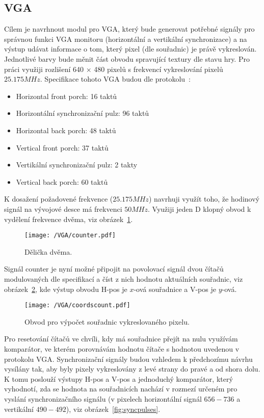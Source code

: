 \documentclass{report}
\begin{document}
\subsection{VGA}\label{sec:vgasub}
Cílem je navrhnout modul pro VGA, který bude generovat potřebné signály pro správnou funkci VGA monitoru (horizontální a vertikální synchronizace) a na výstup udávat informace o tom, který pixel (dle souřadnic) je právě vykreslován. Jednotlivé barvy bude měnit část obvodu spravující textury dle stavu hry. Pro práci využiji rozlišení 640 × 480 pixelů s frekvencí vykreslování pixelů $25.175MHz$. Specifikace tohoto VGA budou dle protokolu~\cite{vga}: 
\begin{itemize}
  \item Horizontal front porch: 16 taktů
  \item Horizontální synchronizační pulz: 96 taktů
  \item Horizontal back porch: 48 taktů
  \item Vertical front porch: 37 taktů
  \item Vertikální synchronizační pulz: 2 takty
  \item Vertical back porch: 60 taktů
\end{itemize}
K dosažení požadovené frekvence ($25.175MHz$) navrhuji využít toho, že hodinový signál na vývojové desce má frekvenci $50MHz$. Využiji jeden D klopný obvod k vydělení frekvence dvěma, viz obrázek~\ref{fig:vgacounter}.
\begin{figure}
\centering
\texttt{[image: /VGA/counter.pdf]}
\caption{Dělička dvěma.}
\label{fig:vgacounter}
\end{figure}
Signál counter je nyní možné připojit na povolovací signál dvou čítačů modulovaných dle specifikací a číst z nich hodnotu aktuálních souřadnic, viz obrázek~\ref{fig:vgapos}, kde výstup obvodu H-pos je $x$-ová souřadnice a V-pos je $y$-ová.
\begin{figure}
\centering
\texttt{[image: /VGA/coordscount.pdf]}
\caption{Obvod pro výpočet souřadnic vykreslovaného pixelu.}
\label{fig:vgapos}
\end{figure}
Pro resetování čítačů ve chvíli, kdy má souřadnice přejít na nulu využívám komparátor, ve kterém porovnávám hodnotu čítače s hodnotou uvedenou v protokolu VGA. Synchronizační signály budou vzhledem k předchozímu návrhu vysílány tak, aby byly pixely vykreslovány z levé strany do pravé a od shora dolu. K tomu poslouží výstupy H-pos a V-pos a jednoduchý komparátor, který vyhodnotí, zda se hodnota na souřadnicích nachází v rozmezí určeném pro vyslání synchronizačního signálu (v pixelech horizontální signál $656 - 736$ a vertikální $490 - 492$), viz obrázek~\ref{fig:syncpulses}.
\end{document}
